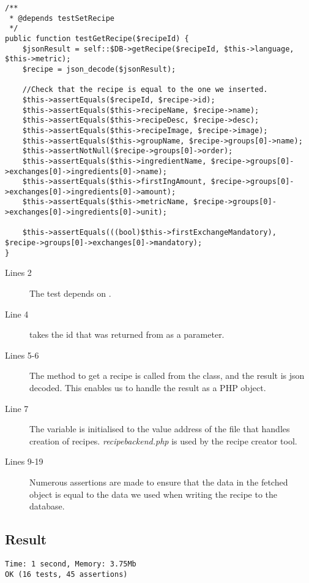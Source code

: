 \begin{lstlisting}[language=phpstyle]
/**
 * @depends testSetRecipe
 */
public function testGetRecipe($recipeId) {
    $jsonResult = self::$DB->getRecipe($recipeId, $this->language, $this->metric);
    $recipe = json_decode($jsonResult);

    //Check that the recipe is equal to the one we inserted.
    $this->assertEquals($recipeId, $recipe->id);
    $this->assertEquals($this->recipeName, $recipe->name);
    $this->assertEquals($this->recipeDesc, $recipe->desc);
    $this->assertEquals($this->recipeImage, $recipe->image);
    $this->assertEquals($this->groupName, $recipe->groups[0]->name);
    $this->assertNotNull($recipe->groups[0]->order);
    $this->assertEquals($this->ingredientName, $recipe->groups[0]->exchanges[0]->ingredients[0]->name);
    $this->assertEquals($this->firstIngAmount, $recipe->groups[0]->exchanges[0]->ingredients[0]->amount);
    $this->assertEquals($this->metricName, $recipe->groups[0]->exchanges[0]->ingredients[0]->unit);

    $this->assertEquals(((bool)$this->firstExchangeMandatory), $recipe->groups[0]->exchanges[0]->mandatory);
}
\end{lstlisting}%
\begin{description}
\item[Lines 2] The test depends on .
\item[Line 4]  takes the id that was returned from  as a parameter.
\item[Lines 5-6] The method to get a recipe is called from the  class, and the result is \ac{json} decoded. This enables us to handle the result as a PHP object.
\item[Line 7] The  variable is initialised to the value address of the file that handles creation of recipes. \textit{recipebackend.php} is used by the recipe creator tool.%
\item[Lines 9-19] Numerous assertions are made to ensure that the data in the fetched object is equal to the data we used when writing the recipe to the database.
\end{description}

\subsection*{Result}
\begin{lstlisting}[numbers=none, basicstyle=\ttfamily, caption={The result of the PHPUnit test}]
Time: 1 second, Memory: 3.75Mb
OK (16 tests, 45 assertions)
\end{lstlisting}

